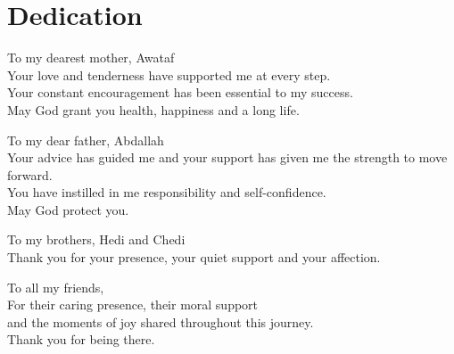 \chapter*{Dedication}

\begin{center}
{\huge T}o my dearest mother, Awataf\\
Your love and tenderness have supported me at every step.\\
Your constant encouragement has been essential to my success.\\
May God grant you health, happiness and a long life.

\vspace{1cm}

{\huge T}o my dear father, Abdallah\\
Your advice has guided me and your support has given me the strength to move forward.\\
You have instilled in me responsibility and self-confidence.\\
May God protect you.

\vspace{1cm}

{\huge T}o my brothers, Hedi and Chedi\\
Thank you for your presence, your quiet support and your affection.

\vspace{1cm}

{\huge T}o all my friends,\\
For their caring presence, their moral support\\
and the moments of joy shared throughout this journey.\\
Thank you for being there.
\end{center}

